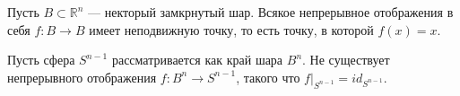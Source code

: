 \begin{to_thr}
	Пусть $B \subset \mathbb{R}^n$ --- некторый замкрнутый шар. Всякое непрерывное отображения в себя $f \colon B \rightarrow B$ имеет неподвижную точку, то есть точку, в которой $f(x) = x$.
\end{to_thr}

\begin{to_thr}
	Пусть сфера $S^{n-1}$ рассматривается как край шара $B^n$. Не существует непрерывного отображения $f \colon B^n \rightarrow S^{n-1}$, такого что $f |_{S^{n-1}} = id_{S^{n-1}}$.
\end{to_thr}